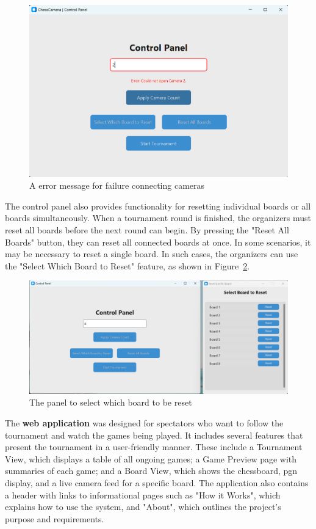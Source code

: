 \begin{figure}[h!] \centering \includegraphics[width=0.75\linewidth]{figures/results/frontend/control-panel/camera-error.png} \caption[Error message for camera connections]{A error message for failure connecting cameras}\label{fig:control-panel-camera-error} \end{figure}

The control panel also provides functionality for resetting individual boards or all boards simultaneously. When a tournament round is finished, the organizers must reset all boards before the next round can begin. By pressing the "Reset All Boards" button, they can reset all connected boards at once. In some scenarios, it may be necessary to reset a single board. In such cases, the organizers can use the "Select Which Board to Reset" feature, as shown in Figure~\ref{fig:control-panel-reset-boards}. \\

\begin{figure}[h!] \centering \includegraphics[width=0.75\linewidth]{figures/results/frontend/control-panel/reset-boards.png} \caption[Panel to reset a single board]{The panel to select which board to be reset}\label{fig:control-panel-reset-boards} \end{figure}

The \textbf{web application} was designed for spectators  who want to follow the tournament and watch the games being played. It includes several features that present the tournament in a user-friendly manner. These include a Tournament View, which displays a table of all ongoing games; a Game Preview page with summaries of each game; and a Board View, which shows the chessboard, \gls{pgn} display, and a live camera feed for a specific board. The application also contains a header with links to informational pages such as "How it Works", which explains how to use the system, and "About", which outlines the project’s purpose and requirements. \\


